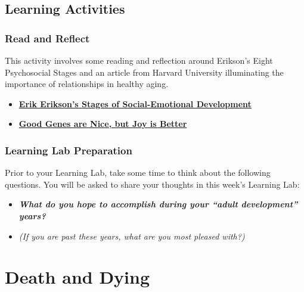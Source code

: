 \documentclass[
]{book}
\providecommand{\tightlist}{%
  \setlength{\itemsep}{0pt}\setlength{\parskip}{0pt}}
\begin{document}
\hypertarget{learning-activities-3}{%
\subsection*{Learning Activities}\label{learning-activities-3}}

\hypertarget{read-and-reflect-1}{%
\subsubsection*{Read and Reflect}\label{read-and-reflect-1}}

This activity involves some reading and reflection around Erikson's Eight Psychosocial Stages and an article from Harvard University illuminating the importance of relationships in healthy aging.

\begin{itemize}
\tightlist
\item
  \href{https://childdevelopmentinfo.com/child-development/erickson/\#gs.d8mpcv}{\textbf{Erik Erikson's Stages of Social-Emotional Development}}
\item
  \href{https://news.harvard.edu/gazette/story/2017/04/over-nearly-80-years-harvard-study-has-been-showing-how-to-live-a-healthy-and-happy-life/}{\textbf{Good Genes are Nice, but Joy is Better}}
\end{itemize}

\hypertarget{learning-lab-preparation-3}{%
\subsubsection*{Learning Lab Preparation}\label{learning-lab-preparation-3}}

Prior to your Learning Lab, take some time to think about the following questions. You will be asked to share your thoughts in this week's Learning Lab:

\begin{itemize}
\tightlist
\item
  \textbf{\emph{What do you hope to accomplish during your ``adult development'' years?}}
\item
  \emph{(If you are past these years, what are you most pleased with?)}
\end{itemize}

\hypertarget{death-and-dying}{%
\section{Death and Dying}\label{death-and-dying}}
\end{document}
